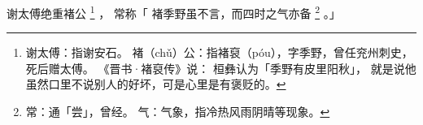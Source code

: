 
\switchcolumn*[\section{}]

谢太傅绝重褚公%
\footnote{%
    谢太傅：指谢安石。
    褚（chǔ）公：指褚裒（póu），字季野，曾任兖州刺史，死后赠太傅。
            《晋书·褚裒传》说：
            桓彝认为「季野有皮里阳秋」，
            就是说他虽然口里不说别人的好坏，可是心里是有褒贬的。
}%
，
常称「
    褚季野虽不言，而四时之气亦备%
    \footnote{%
        常：通「尝」，曾经。
        气：气象，指冷热风雨阴晴等现象。
    }%
。」

\switchcolumn




